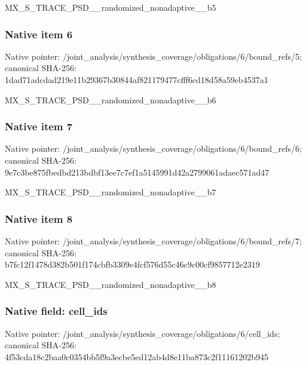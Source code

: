 \documentclass[10pt,a4paper]{article}
\begin{document}
\begingroup\raggedright\sloppy MX\_\allowbreak{}S\_\allowbreak{}TRACE\_\allowbreak{}PSD\_\allowbreak{}\_\allowbreak{}randomized\_\allowbreak{}nonadaptive\_\allowbreak{}\_\allowbreak{}b5\par\endgroup

\subsubsection{Native item 6}
Native pointer: /joint\_\allowbreak{}analysis/synthesis\_\allowbreak{}coverage/obligations/6/bound\_\allowbreak{}refs/5; canonical SHA-256: 1dad71adcdad219e11b29367b30844af821179477cfff6cd18d58a59eb4537a1

\begingroup\raggedright\sloppy MX\_\allowbreak{}S\_\allowbreak{}TRACE\_\allowbreak{}PSD\_\allowbreak{}\_\allowbreak{}randomized\_\allowbreak{}nonadaptive\_\allowbreak{}\_\allowbreak{}b6\par\endgroup

\subsubsection{Native item 7}
Native pointer: /joint\_\allowbreak{}analysis/synthesis\_\allowbreak{}coverage/obligations/6/bound\_\allowbreak{}refs/6; canonical SHA-256: 9e7c3be875fbedbd213bdbf13ee7c7ef1a5145991d42a2799061adaec571ad47

\begingroup\raggedright\sloppy MX\_\allowbreak{}S\_\allowbreak{}TRACE\_\allowbreak{}PSD\_\allowbreak{}\_\allowbreak{}randomized\_\allowbreak{}nonadaptive\_\allowbreak{}\_\allowbreak{}b7\par\endgroup

\subsubsection{Native item 8}
Native pointer: /joint\_\allowbreak{}analysis/synthesis\_\allowbreak{}coverage/obligations/6/bound\_\allowbreak{}refs/7; canonical SHA-256: b7fc12f1478d382b501f174cbfb3309e4fcf576d55c46c9c00cf9857712e2319

\begingroup\raggedright\sloppy MX\_\allowbreak{}S\_\allowbreak{}TRACE\_\allowbreak{}PSD\_\allowbreak{}\_\allowbreak{}randomized\_\allowbreak{}nonadaptive\_\allowbreak{}\_\allowbreak{}b8\par\endgroup

\subsubsection{Native field: cell\_\allowbreak{}ids}
Native pointer: /joint\_\allowbreak{}analysis/synthesis\_\allowbreak{}coverage/obligations/6/cell\_\allowbreak{}ids; canonical SHA-256: 4f53cda18c2baa0c0354bb5f9a3ecbe5ed12ab4d8e11ba873c2f11161202b945
\end{document}
